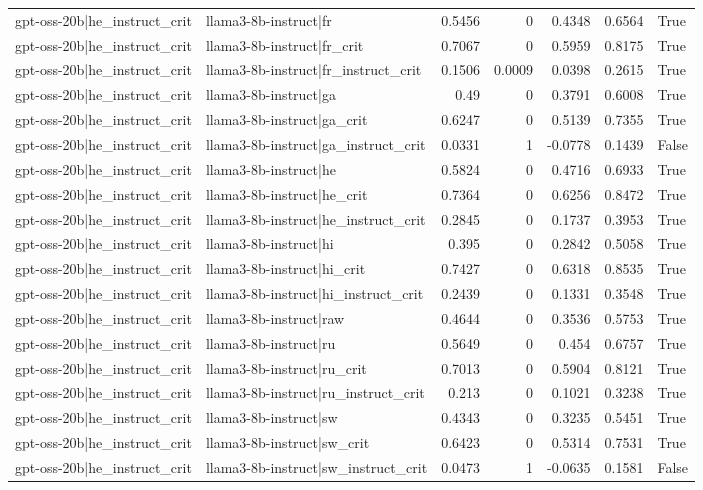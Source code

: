 \begin{table}
\begin{tabular}{l l r r r r l}
gpt-oss-20b|he_instruct_crit & llama3-8b-instruct|fr & 0.5456 & 0 & 0.4348 & 0.6564 & True \\
gpt-oss-20b|he_instruct_crit & llama3-8b-instruct|fr_crit & 0.7067 & 0 & 0.5959 & 0.8175 & True \\
gpt-oss-20b|he_instruct_crit & llama3-8b-instruct|fr_instruct_crit & 0.1506 & 0.0009 & 0.0398 & 0.2615 & True \\
gpt-oss-20b|he_instruct_crit & llama3-8b-instruct|ga & 0.49 & 0 & 0.3791 & 0.6008 & True \\
gpt-oss-20b|he_instruct_crit & llama3-8b-instruct|ga_crit & 0.6247 & 0 & 0.5139 & 0.7355 & True \\
gpt-oss-20b|he_instruct_crit & llama3-8b-instruct|ga_instruct_crit & 0.0331 & 1 & -0.0778 & 0.1439 & False \\
gpt-oss-20b|he_instruct_crit & llama3-8b-instruct|he & 0.5824 & 0 & 0.4716 & 0.6933 & True \\
gpt-oss-20b|he_instruct_crit & llama3-8b-instruct|he_crit & 0.7364 & 0 & 0.6256 & 0.8472 & True \\
gpt-oss-20b|he_instruct_crit & llama3-8b-instruct|he_instruct_crit & 0.2845 & 0 & 0.1737 & 0.3953 & True \\
gpt-oss-20b|he_instruct_crit & llama3-8b-instruct|hi & 0.395 & 0 & 0.2842 & 0.5058 & True \\
gpt-oss-20b|he_instruct_crit & llama3-8b-instruct|hi_crit & 0.7427 & 0 & 0.6318 & 0.8535 & True \\
gpt-oss-20b|he_instruct_crit & llama3-8b-instruct|hi_instruct_crit & 0.2439 & 0 & 0.1331 & 0.3548 & True \\
gpt-oss-20b|he_instruct_crit & llama3-8b-instruct|raw & 0.4644 & 0 & 0.3536 & 0.5753 & True \\
gpt-oss-20b|he_instruct_crit & llama3-8b-instruct|ru & 0.5649 & 0 & 0.454 & 0.6757 & True \\
gpt-oss-20b|he_instruct_crit & llama3-8b-instruct|ru_crit & 0.7013 & 0 & 0.5904 & 0.8121 & True \\
gpt-oss-20b|he_instruct_crit & llama3-8b-instruct|ru_instruct_crit & 0.213 & 0 & 0.1021 & 0.3238 & True \\
gpt-oss-20b|he_instruct_crit & llama3-8b-instruct|sw & 0.4343 & 0 & 0.3235 & 0.5451 & True \\
gpt-oss-20b|he_instruct_crit & llama3-8b-instruct|sw_crit & 0.6423 & 0 & 0.5314 & 0.7531 & True \\
gpt-oss-20b|he_instruct_crit & llama3-8b-instruct|sw_instruct_crit & 0.0473 & 1 & -0.0635 & 0.1581 & False \\

\end{tabular}
\end{table}
